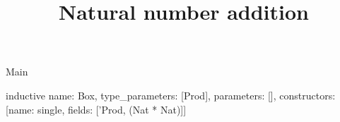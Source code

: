 \begin{lexlean}{Main}
\title{Natural number addition}
\begin{semanticmodule}
inductive{
  name: Box,
  type_parameters: [Prod],
  parameters: [],
  constructors: [{name: single, fields: ['Prod, (Nat * Nat)]}]
}
\end{semanticmodule}
\end{lexlean}
